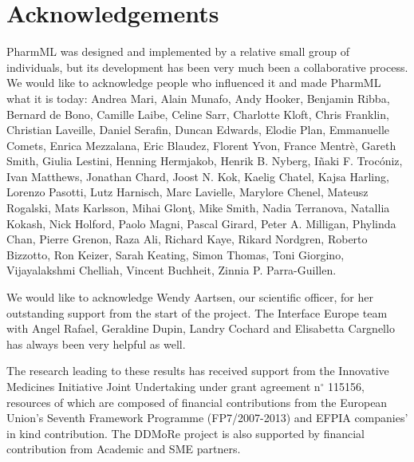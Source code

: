 \chapter*{Acknowledgements}

PharmML was designed and implemented by a relative small group of individuals, 
but its development has been very much been a collaborative process.
We would like to acknowledge people who influenced it and made PharmML
what it is today: Andrea Mari, Alain Munafo, Andy Hooker, 
Benjamin Ribba, Bernard de Bono, Camille Laibe, Celine Sarr, Charlotte Kloft, Chris Franklin, 
Christian Laveille, Daniel Serafin, Duncan Edwards, Elodie Plan, 
Emmanuelle Comets, Enrica Mezzalana, Eric Blaudez, Florent Yvon, France Mentr\`{e}, 
Gareth Smith, Giulia Lestini, Henning Hermjakob, Henrik B. Nyberg, 
I\~{n}aki F. Troc\'{o}niz, Ivan Matthews, Jonathan Chard, Joost N. Kok, Kaelig Chatel, 
Kajsa Harling, Lorenzo Pasotti, Lutz Harnisch, Marc Lavielle, 
Marylore Chenel, Mateusz Rogalski, Mats Karlsson, Mihai Glon\c{t}, Mike Smith, 
Nadia Terranova, Natallia Kokash, Nick Holford, Paolo Magni, Pascal Girard, Peter A. Milligan, 
Phylinda Chan, Pierre Grenon, Raza Ali, Richard Kaye, Rikard Nordgren, Roberto Bizzotto, 
Ron Keizer, Sarah Keating, Simon Thomas, Toni Giorgino, Vijayalakshmi Chelliah, 
Vincent Buchheit, Zinnia P. Parra-Guillen.

We would like to acknowledge Wendy Aartsen, our scientific officer, for her outstanding support
from the start of the project. The Interface Europe team with  Angel Rafael, Geraldine Dupin, 
Landry Cochard and Elisabetta Cargnello has always been very helpful as well.

The research leading to these results has received support from the Innovative Medicines 
Initiative Joint Undertaking under grant agreement n$^{\circ}$ 115156, resources of which are 
composed of financial contributions from the European Union's Seventh Framework 
Programme (FP7/2007-2013) and EFPIA companies' in kind contribution. The DDMoRe 
project is also supported by financial contribution from Academic and SME partners.